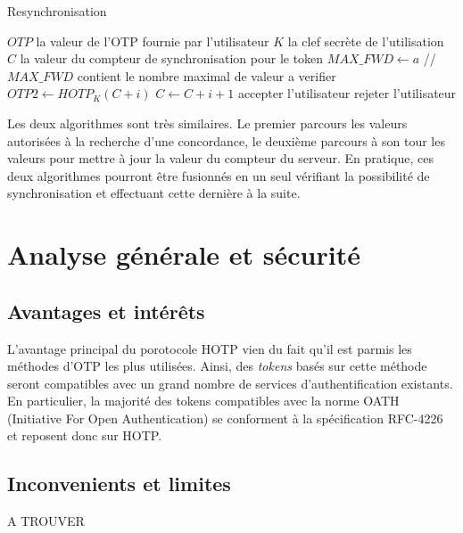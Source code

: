 \documentclass{../res/univ-projet}
\begin{document}
  \begin{algorithm}
    \caption{Resynchronisation}
    \label{HOTP:synch}
    
    \begin{algorithmic}
      \REQUIRE $OTP$ la valeur de l'OTP fournie par l'utilisateur
      \REQUIRE $K$ la clef secrète de l'utilisation
      \REQUIRE $C$ la valeur du compteur de synchronisation pour le token
      \STATE $MAX\_FWD \leftarrow a$ //$MAX\_FWD$ contient le nombre maximal de valeur a verifier
	\STATE $OTP2 \leftarrow HOTP_K(C + i)$
	  \STATE $C \leftarrow C + i + 1$
	  \STATE accepter l'utilisateur
	\ENDIF
      \ENDFOR
      \STATE rejeter l'utilisateur
    \end{algorithmic}
  \end{algorithm}
  
  Les deux algorithmes sont très similaires. Le premier parcours les valeurs autorisées à la recherche d'une concordance, le deuxième parcours à son tour les valeurs pour 
  mettre à jour la valeur du compteur du serveur. En pratique, ces deux algorithmes pourront \^etre fusionnés en un seul vérifiant la possibilité de synchronisation et 
  effectuant cette dernière à la suite.
  
\section{Analyse générale et sécurité}

  \subsection{Avantages et intér\^ets}
  L'avantage principal du porotocole \og{}HOTP\fg{} vien du fait qu'il est parmis les méthodes d'OTP les plus utilisées. Ainsi, des \emph{tokens} basés sur cette méthode 
  seront compatibles avec un grand nombre de services d'authentification existants. En particulier, la majorité des tokens compatibles avec la norme OATH (Initiative For 
  Open Authentication) se conforment à la spécification RFC-4226 et reposent donc sur HOTP.
  
  \subsection{Inconvenients et limites}
  A TROUVER \\
  
\end{document}
